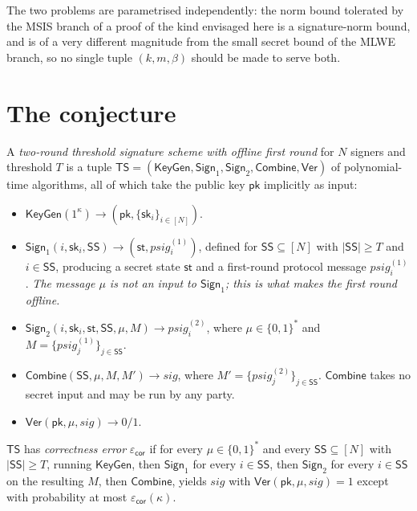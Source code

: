 \documentclass{aicr-conjecture}
\newcommand{\TS}{\mathsf{TS}}
\newcommand{\pk}{\mathsf{pk}}
\newcommand{\seck}{\mathsf{sk}}
\newcommand{\KeyGen}{\mathsf{KeyGen}}
\newcommand{\Signone}{\mathsf{Sign}_1}
\newcommand{\Signtwo}{\mathsf{Sign}_2}
\newcommand{\Combine}{\mathsf{Combine}}
\newcommand{\Ver}{\mathsf{Ver}}
\newcommand{\SSet}{\mathsf{SS}}
\newcommand{\sstate}{\mathsf{st}}
\newcommand{\psig}{\mathit{psig}}
\newcommand{\sig}{\mathit{sig}}
\begin{document}
The two problems are parametrised independently: the norm bound
tolerated by the MSIS branch of a proof of the kind envisaged here is a
signature-norm bound, and is of a very different magnitude from the
small secret bound of the MLWE branch, so no single tuple
$(k, m, \beta)$ should be made to serve both.

\section{The conjecture}\label{sec:conjectures}

\begin{definition}\label{def:ts}
A \emph{two-round threshold signature scheme with offline first round}
for $N$ signers and threshold $T$ is a tuple
$\TS = (\KeyGen, \Signone, \Signtwo, \Combine, \Ver)$ of
polynomial-time algorithms, all of which take the public key $\pk$
implicitly as input:
\begin{itemize}[leftmargin=1.2em]
\item $\KeyGen(1^{\kappa}) \to (\pk, \{\seck_i\}_{i \in [N]})$.
\item $\Signone(i, \seck_i, \SSet) \to (\sstate, \psig^{(1)}_i)$,
defined for $\SSet \subseteq [N]$ with $|\SSet| \ge T$ and
$i \in \SSet$, producing a secret state $\sstate$ and a first-round
protocol message $\psig^{(1)}_i$. \emph{The message $\mu$ is not an
input to $\Signone$; this is what makes the first round offline.}
\item $\Signtwo(i, \seck_i, \sstate, \SSet, \mu, M) \to
\psig^{(2)}_i$, where $\mu \in \{0,1\}^{*}$ and
$M = \{\psig^{(1)}_j\}_{j \in \SSet}$.
\item $\Combine(\SSet, \mu, M, M') \to \sig$, where
$M' = \{\psig^{(2)}_j\}_{j \in \SSet}$. $\Combine$ takes no secret
input and may be run by any party.
\item $\Ver(\pk, \mu, \sig) \to 0/1$.
\end{itemize}
$\TS$ has \emph{correctness error} $\varepsilon_{\mathsf{cor}}$ if for
every $\mu \in \{0,1\}^{*}$ and every $\SSet \subseteq [N]$ with
$|\SSet| \ge T$, running $\KeyGen$, then $\Signone$ for every
$i \in \SSet$, then $\Signtwo$ for every $i \in \SSet$ on the resulting
$M$, then $\Combine$, yields $\sig$ with $\Ver(\pk, \mu, \sig) = 1$
except with probability at most $\varepsilon_{\mathsf{cor}}(\kappa)$.
\end{definition}
\end{document}
